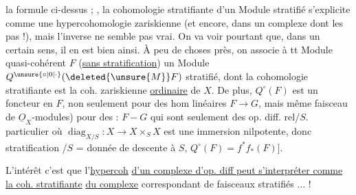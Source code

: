 la formule ci-dessus ;  , la cohomologie stratifiante d'un Module stratifié s'explicite comme une hypercohomologie zariskienne (et encore, dans un complexe dont les    pas  !),  mais l'inverse ne semble \reversemarginpar\margin{\hfill\raisebox{-10\baselineskip}[0pt][0pt]{\rule{.4pt}{10\baselineskip}}}\normalmarginpar pas vrai. On va voir pourtant que, dans un certain sens, il en est bien ainsi. À peu de choses près, on associe à tt Module quasi-cohérent $F$ (\uline{sans stratification}) un Module   $Q^{\unsure{\circ|0|\cdot}}(\deleted{\unsure{M}}F)$ stratifié, dont la cohomologie stratifiante est la coh. zariskienne \uline{ordinaire} de $X$. De plus, $Q^\circ(F)$ est un foncteur en $F$, non seulement pour des hom linéaires $F\to G$, mais même   faisceau  de $\underline O_X$-modules) pour des   : $F\mathbin{-}G$ qui sont seulement des op. diff. rel/$S$.  \inserted{[-- Dans le cas très} particulier où $\operatorname{diag}_{X/S}:X\longrightarrow X\mathbin{\times}_S X$ est une immersion nilpotente, donc  stratification /$S$ = donnée de descente à $S$, $Q^\circ(F)=f^*f_*(F)$].

L'intérêt  c'est que l'\uline{hypercoh}  \uline{d'un complexe d'op. diff peut s'interpréter comme la coh. stratifiante} \uline{du complexe} correspondant de faisceaux stratifiés ... !

